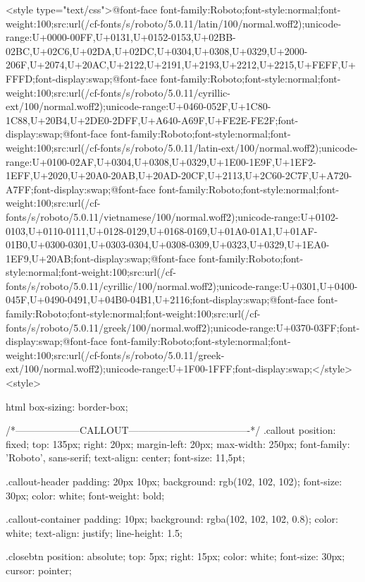 <style type="text/css">@font-face {font-family:Roboto;font-style:normal;font-weight:100;src:url(/cf-fonts/s/roboto/5.0.11/latin/100/normal.woff2);unicode-range:U+0000-00FF,U+0131,U+0152-0153,U+02BB-02BC,U+02C6,U+02DA,U+02DC,U+0304,U+0308,U+0329,U+2000-206F,U+2074,U+20AC,U+2122,U+2191,U+2193,U+2212,U+2215,U+FEFF,U+FFFD;font-display:swap;}@font-face {font-family:Roboto;font-style:normal;font-weight:100;src:url(/cf-fonts/s/roboto/5.0.11/cyrillic-ext/100/normal.woff2);unicode-range:U+0460-052F,U+1C80-1C88,U+20B4,U+2DE0-2DFF,U+A640-A69F,U+FE2E-FE2F;font-display:swap;}@font-face {font-family:Roboto;font-style:normal;font-weight:100;src:url(/cf-fonts/s/roboto/5.0.11/latin-ext/100/normal.woff2);unicode-range:U+0100-02AF,U+0304,U+0308,U+0329,U+1E00-1E9F,U+1EF2-1EFF,U+2020,U+20A0-20AB,U+20AD-20CF,U+2113,U+2C60-2C7F,U+A720-A7FF;font-display:swap;}@font-face {font-family:Roboto;font-style:normal;font-weight:100;src:url(/cf-fonts/s/roboto/5.0.11/vietnamese/100/normal.woff2);unicode-range:U+0102-0103,U+0110-0111,U+0128-0129,U+0168-0169,U+01A0-01A1,U+01AF-01B0,U+0300-0301,U+0303-0304,U+0308-0309,U+0323,U+0329,U+1EA0-1EF9,U+20AB;font-display:swap;}@font-face {font-family:Roboto;font-style:normal;font-weight:100;src:url(/cf-fonts/s/roboto/5.0.11/cyrillic/100/normal.woff2);unicode-range:U+0301,U+0400-045F,U+0490-0491,U+04B0-04B1,U+2116;font-display:swap;}@font-face {font-family:Roboto;font-style:normal;font-weight:100;src:url(/cf-fonts/s/roboto/5.0.11/greek/100/normal.woff2);unicode-range:U+0370-03FF;font-display:swap;}@font-face {font-family:Roboto;font-style:normal;font-weight:100;src:url(/cf-fonts/s/roboto/5.0.11/greek-ext/100/normal.woff2);unicode-range:U+1F00-1FFF;font-display:swap;}</style>
<style>


html {
  box-sizing: border-box;
}

/*--------------------CALLOUT-------------------------------------*/
.callout {
  position: fixed;
  top: 135px;
  right: 20px;
  margin-left: 20px;
  max-width: 250px;
  font-family: 'Roboto', sans-serif;
  text-align: center;
  font-size: 11,5pt;
}

.callout-header {
  padding: 20px 10px;
  background: rgb(102, 102, 102);
  font-size: 30px;
  color: white;
  font-weight: bold;
}

.callout-container {
  padding: 10px;
  background: rgba(102, 102, 102, 0.8);
  color: white;
  text-align: justify;
  line-height: 1.5;
}

.closebtn {
  position: absolute;
  top: 5px;
  right: 15px;
  color: white;
  font-size: 30px;
  cursor: pointer;
}

